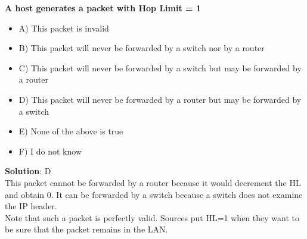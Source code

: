 \documentclass[11pt]{article}
\begin{document}
\begin{tcolorbox}[
  colback=gray!15,     %
  colframe=black!50,    %
  boxrule=1pt,       %
  arc=3mm,             %
  left=4mm, right=4mm, top=2mm, bottom=2mm %
]
\textbf{A host generates a packet with Hop Limit = 1}

\vspace{0.3cm}

\begin{itemize}
	\item A) This packet is invalid
	\item B) This packet will never be forwarded by a switch nor by a router
	\item C) This packet will never be forwarded by a switch but may be forwarded by a router
	\item D) This packet will never be forwarded by a router but may be forwarded by a switch
	\item E) None of the above is true
	\item F) I do not know \\
\end{itemize}

\textbf{Solution}: D \\

This packet cannot be forwarded by a router because it would
decrement the HL and obtain 0. It can be forwarded by a switch
because a switch does not examine the IP header. \\
Note that such a packet is perfectly valid. Sources put HL=1 when
they want to be sure that the packet remains in the LAN.

\end{tcolorbox}
\end{document}

